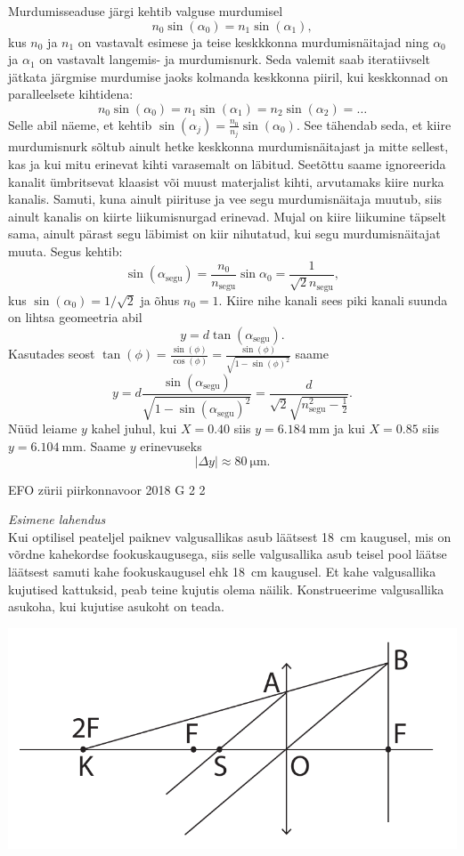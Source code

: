 \documentclass[11pt, twoside]{article}
\begin{document}
{{\ifSolution
Murdumisseaduse järgi kehtib valguse murdumisel
$$n_0\sin(\alpha_0)=n_1\sin(\alpha_1),$$
kus $n_0$ ja $n_1$ on vastavalt esimese ja teise keskkkonna murdumisnäitajad ning $\alpha_0$ ja $\alpha_1$ on vastavalt langemis- ja murdumisnurk. Seda valemit saab iteratiivselt jätkata järgmise murdumise jaoks kolmanda keskkonna piiril, kui keskkonnad on paralleelsete kihtidena:
$$n_0\sin(\alpha_0)=n_1\sin(\alpha_1)=n_2\sin(\alpha_2) = \dots$$
Selle abil näeme, et kehtib $\sin(\alpha_j)=\frac{n_0}{n_j}\sin(\alpha_0)$. See tähendab seda, et kiire murdumisnurk sõltub ainult hetke keskkonna murdumisnäitajast ja mitte sellest, kas ja kui mitu erinevat kihti varasemalt on läbitud. Seetõttu saame ignoreerida kanalit ümbritsevat klaasist või muust materjalist kihti, arvutamaks kiire nurka kanalis. Samuti, kuna ainult piirituse ja vee segu murdumisnäitaja muutub, siis ainult kanalis on kiirte liikumisnurgad erinevad. Mujal on kiire liikumine täpselt sama, ainult pärast segu läbimist on kiir nihutatud, kui segu murdumisnäitajat muuta. Segus kehtib:
$$\sin(\alpha_{\text{segu}})=\frac{n_0}{n_{\text{segu}}}\sin{\alpha_0} = \frac{1}{\sqrt{2}n_{\text{segu}}},$$
kus $\sin(\alpha_0) = 1/\sqrt{2}$ ja õhus $n_0=1$. Kiire nihe kanali sees piki kanali suunda on lihtsa geomeetria abil $$y=d\tan(\alpha_{\text{segu}}).$$
Kasutades seost $\tan(\phi) = \frac{\sin(\phi)}{\cos(\phi)} = \frac{\sin(\phi)}{\sqrt{1-\sin(\phi)^2}}$ saame
$$y = d \frac{\sin(\alpha_{\text{segu}})}{\sqrt{1-\sin(\alpha_{\text{segu}})^2}} = \frac{d}{\sqrt{2}\sqrt{n_{\text{segu}}^2-\frac12}}.$$
Nüüd leiame $y$ kahel juhul, kui $X=\num{0.40}$ siis $y=\SI{6.184}{\milli\meter}$ ja kui $X=\num{0.85}$ siis $y=\SI{6.104}{\milli\meter}$. Saame $y$ erinevuseks
$$|\Delta y| \approx \SI{80}{\micro\meter}.$$
\fi
}

{EFO zürii} %
{piirkonnavoor} %
{2018} %
{G 2} %
{2} %
{

\ifSolution
\emph{Esimene lahendus}\\
Kui optilisel peateljel paiknev valgusallikas asub läätsest \SI{18}{cm} kaugusel, mis on võrdne kahekordse fookuskaugusega, siis selle valgusallika 
 asub teisel pool läätse läätsest samuti kahe fookuskaugusel ehk \SI{18}{cm} kaugusel. Et kahe valgusallika kujutised kattuksid, peab teine kujutis olema näilik.
Konstrueerime valgusallika asukoha, kui kujutise asukoht on teada. 
  \vspace{-10pt}
  \begin{center}
    \includegraphics[width=0.7\linewidth]{2018-v2g-02-valgusallikaslah}
  \end{center}
  \vspace{-10pt}

}}
\end{document}
